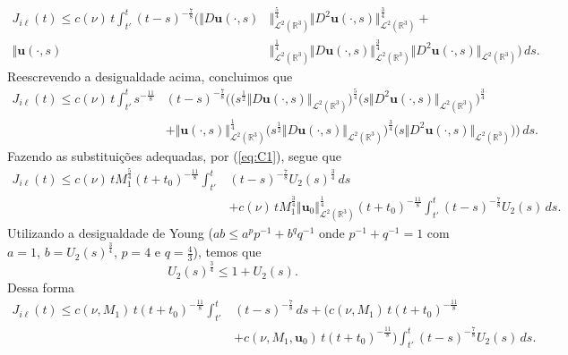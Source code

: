 \documentclass[a4paper, 11pt]{book}
\theoremstyle{definition}
\newcommand{\bR}{\mathbb{R}}
\newcommand{\bu}{\mathbf{u}}
\newcommand{\cL}{\mathcal{L}}
\begin{document}
\begin{prf}
\[\begin{aligned}
            J_{i\ell}(t) \leqslant c(\nu) \, t \int_{t'}^t  (t - s)^{-\frac{7}{8}} \Big( \Vert D\bu(\cdot,s) &\Vert_{\cL^2(\bR^3)}^{\frac{5}{4}} \Vert D^2\bu(\cdot,s) \Vert_{\cL^2(\bR^3)}^{\frac{3}{4}} +\\ \Vert \bu(\cdot,s) &\Vert_{\cL^2(\bR^3)}^{\frac{1}{4}} \Vert D\bu(\cdot,s) \Vert_{\cL^2(\bR^3)}^{\frac{3}{4}} \Vert D^2\bu(\cdot,s) \Vert_{\cL^2(\bR^3)} \Big) \, ds.
        \end{aligned}
    \]
    Reescrevendo a desigualdade acima, concluimos que
    \[
        \begin{aligned}
            J_{i\ell}(t) \leqslant c(\nu) \, t \int_{t'}^t s^{-\frac{11}{8}} &(t - s)^{-\frac{7}{8}} \Big( \big(s^{\frac{1}{2}}\Vert D\bu(\cdot,s) \Vert_{\cL^2(\bR^3)} \big)^{\frac{5}{4}} \big( s\Vert D^2\bu(\cdot,s) \Vert_{\cL^2(\bR^3)}\big)^{\frac{3}{4}}\\ &+ \Vert \bu(\cdot,s) \Vert_{\cL^2(\bR^3)}^{\frac{1}{4}} \big( s^{\frac{1}{2}}\Vert D\bu(\cdot,s) \Vert_{\cL^2(\bR^3)}\big)^{\frac{3}{4}} \big(s\Vert D^2\bu(\cdot,s) \Vert_{\cL^2(\bR^3)}\big) \Big) \, ds.
        \end{aligned}
    \]
    Fazendo as substituições adequadas, por (\ref{eq:C1}), segue que
    \[
        \begin{aligned}
            J_{i\ell}(t) \leqslant c(\nu) \,t M_1^{\frac{5}{4}} (t + t_0)^{-\frac{11}{8}} \int_{t'}^t &(t - s)^{-\frac{7}{8}} U_2(s)^{\frac{3}{4}} \,ds\\ 
            &+ c(\nu) \, t M_1^{\frac{3}{4}} \Vert \bu_0 \Vert^{\frac{1}{4}}_{\cL^2(\bR^3)} (t + t_0)^{-\frac{11}{8}} \int_{t'}^{t} (t - s)^{-\frac{7}{8}} U_2(s) \,ds.
        \end{aligned}
    \]
    Utilizando a desigualdade de Young ($ab \leqslant a^pp^{-1} + b^q q^{-1}$ onde $p^{-1} + q^{-1} = 1$ com $a = 1$, $b = U_2(s)^{\frac{3}{4}}$, $p = 4$ e $q = \frac{4}{3}$), temos que
    \begin{equation} \label{eq:youngu2}
        U_2(s)^{\frac{3}{4}} \leqslant 1 + U_2(s).
    \end{equation}
    Dessa forma
    \[
        \begin{aligned}
            J_{i\ell}(t) \leqslant c(\nu, M_1) \,t (t + t_0)^{-\frac{11}{8}} \int_{t'}^t &(t - s)^{-\frac{7}{8}} \,ds + \Big( c(\nu, M_1) \,t (t + t_0)^{-\frac{11}{8}}\\ 
            &+ c(\nu, M_1, \bu_0) \, t (t + t_0)^{-\frac{11}{8}} \Big) \int_{t'}^t (t - s)^{-\frac{7}{8}} U_2(s) \,ds.
        \end{aligned}
\]
\end{prf}
\end{document}
